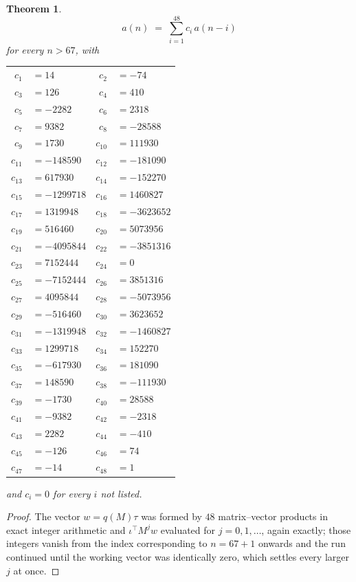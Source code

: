 \documentclass[11pt,a4paper]{article}
\theoremstyle{plain}
\newtheorem{theorem}{Theorem}
\theoremstyle{definition}
\begin{document}
\begin{theorem}
\[
a(n)\;=\;\sum_{i=1}^{48}c_i\,a(n-i)
\]
for every $n>67$, with
\begin{center}\footnotesize
\begin{tabular}{r@{\,}l@{\qquad}r@{\,}l}
$c_{1}$ & $=14$ & $c_{2}$ & $=-74$ \\
$c_{3}$ & $=126$ & $c_{4}$ & $=410$ \\
$c_{5}$ & $=-2282$ & $c_{6}$ & $=2318$ \\
$c_{7}$ & $=9382$ & $c_{8}$ & $=-28588$ \\
$c_{9}$ & $=1730$ & $c_{10}$ & $=111930$ \\
$c_{11}$ & $=-148590$ & $c_{12}$ & $=-181090$ \\
$c_{13}$ & $=617930$ & $c_{14}$ & $=-152270$ \\
$c_{15}$ & $=-1299718$ & $c_{16}$ & $=1460827$ \\
$c_{17}$ & $=1319948$ & $c_{18}$ & $=-3623652$ \\
$c_{19}$ & $=516460$ & $c_{20}$ & $=5073956$ \\
$c_{21}$ & $=-4095844$ & $c_{22}$ & $=-3851316$ \\
$c_{23}$ & $=7152444$ & $c_{24}$ & $=0$ \\
$c_{25}$ & $=-7152444$ & $c_{26}$ & $=3851316$ \\
$c_{27}$ & $=4095844$ & $c_{28}$ & $=-5073956$ \\
$c_{29}$ & $=-516460$ & $c_{30}$ & $=3623652$ \\
$c_{31}$ & $=-1319948$ & $c_{32}$ & $=-1460827$ \\
$c_{33}$ & $=1299718$ & $c_{34}$ & $=152270$ \\
$c_{35}$ & $=-617930$ & $c_{36}$ & $=181090$ \\
$c_{37}$ & $=148590$ & $c_{38}$ & $=-111930$ \\
$c_{39}$ & $=-1730$ & $c_{40}$ & $=28588$ \\
$c_{41}$ & $=-9382$ & $c_{42}$ & $=-2318$ \\
$c_{43}$ & $=2282$ & $c_{44}$ & $=-410$ \\
$c_{45}$ & $=-126$ & $c_{46}$ & $=74$ \\
$c_{47}$ & $=-14$ & $c_{48}$ & $=1$ \\
\end{tabular}
\end{center}
and $c_i=0$ for every $i$ not listed.
\end{theorem}

\begin{proof}
The vector $w=q(M)\tau$ was formed by $48$ matrix--vector products in exact integer
arithmetic and $\iota^{\!\top}M^{j}w$ evaluated for $j=0,1,\dots$, again exactly; those
integers vanish from the index corresponding to $n=67+1$ onwards and the run continued
until the working vector was identically zero, which settles every larger $j$ at once.
\end{proof}
\end{document}
